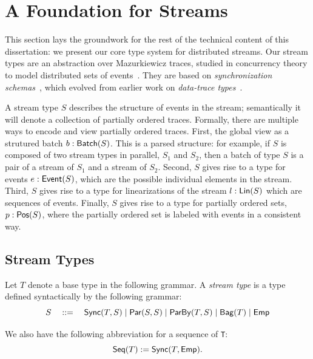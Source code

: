 \chapter{A Foundation for Streams}
\label{cha:foundation}

This section lays the groundwork for the rest of the technical content of this dissertation: we present our core type system for distributed streams.
Our stream types are an abstraction over Mazurkiewicz traces, studied in concurrency theory to model distributed sets of events~\cite{mazurkiewicz1986trace,DiekertR1995}.
They are based on \emph{synchronization schemas}~, which evolved from earlier work on \emph{data-trace types}~.

A stream type $S$ describes the structure of events in the stream;
semantically it will denote a collection of partially ordered traces.
Formally, there are multiple ways to encode and view partially ordered traces.
First, the global view as a strutured batch $b: \mathsf{Batch}({S})$.
This is a parsed structure: for example, if $S$ is composed of two stream types in parallel, $S_1$ and $S_2$, then a batch of type $S$ is a pair of a stream of $S_1$ and a stream of $S_2$.
Second, $S$ gives rise to a type for events $e: \mathsf{Event}({S})$,
which are the possible individual elements in the stream.
Third, $S$ gives rise to a type for linearizations of the stream $l: \mathsf{Lin}({S})$
which are sequences of events.
Finally, $S$ gives rise to a type for partially ordered sets,
$p: \mathsf{Pos}({S})$, where the partially ordered set is labeled with events in a consistent way.

\section{Stream Types}

\begin{definition}
Let $T$ denote a base type in the following grammar.
A \emph{stream type} is a type defined syntactically by the following grammar:
\[
  S \quad ::= \quad
    \mathsf{Sync}({T}, S) \mid
    \mathsf{Par}({S}, {S}) \mid
    \mathsf{ParBy}({T}, S) \mid
    \mathsf{Bag}({T}) \mid
    \mathsf{Emp}{}
\]
\end{definition}

We also have the following abbreviation for a sequence of \texttt{T}:
\[
  \mathsf{Seq}({T}) := \mathsf{Sync}({T}, \mathsf{Emp}{}).
\]

